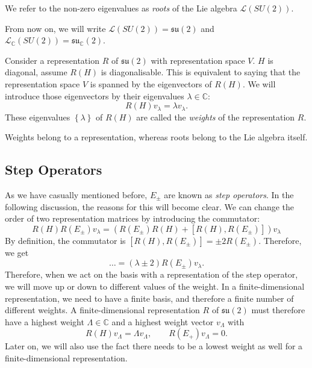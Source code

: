 We refer to the non-zero eigenvalues as \emph{roots} of the Lie algebra $\mathscr{L}(SU(2))$.
\begin{leftbar}
  \begin{remark}
    From now on, we will write $\mathscr{L}(SU(2)) = \mathfrak{su}(2)$ and $\mathscr{L}_\mathbb{C}(SU(2)) = \mathfrak{su}_{\mathbb{C}}(2)$.
  \end{remark}
\end{leftbar}

Consider a representation $R$ of $\mathfrak{su}(2)$ with representation space $V$. $H$ is diagonal, assume $R(H)$ is diagonalisable. This is equivalent to saying that the representation space $V$ is spanned by the eigenvectors of $R(H)$.
We will introduce those eigenvectors by their eigenvalues $\lambda \in \mathbb{C}$:
\begin{equation}
  R(H) v_\lambda = \lambda v_\lambda.
\end{equation}
These eigenvalues $\left\{ \lambda \right\}$ of $R(H)$ are called the \emph{weights} of the representation $R$.
\begin{leftbar}
  \begin{remark}
    Weights belong to a representation, whereas roots belong to the Lie algebra itself.
  \end{remark}
\end{leftbar}

\subsection{Step Operators}%
\label{sub:step_operators}

As we have casually mentioned before, $E_{\pm}$ are known as \emph{step operators}. In the following discussion, the reasons for this will become clear.
We can change the order of two representation matrices by introducing the commutator:
\begin{equation}
  R(H) R(E_{\pm}) v_\lambda = (R(E_{\pm}) R(H) + [R(H), R(E_{\pm})]) v_\lambda
\end{equation}
By definition, the commutator is $[R(H), R(E_\pm)] = \pm 2 R(E_{\pm})$.
Therefore, we get
\begin{equation}
  \dots = (\lambda \pm 2) R(E_\pm) v_\lambda.
\end{equation}
Therefore, when we act on the basis with a representation of the step operator, we will move up or down to different values of the weight.
In a finite-dimensional representation, we need to have a finite basis, and therefore a finite number of different weights.
A finite-dimensional representation $R$ of $\mathfrak{su}(2)$ must therefore have a highest weight $\Lambda \in \mathbb{C}$ and a highest weight vector $v_{\Lambda}$ with
\begin{equation}
  R(H) v_{\Lambda} = \Lambda v_{\Lambda}, \qquad R(E_+) v_\Lambda = 0.
\end{equation}
Later on, we will also use the fact there needs to be a lowest weight as well for a finite-dimensional representation.

